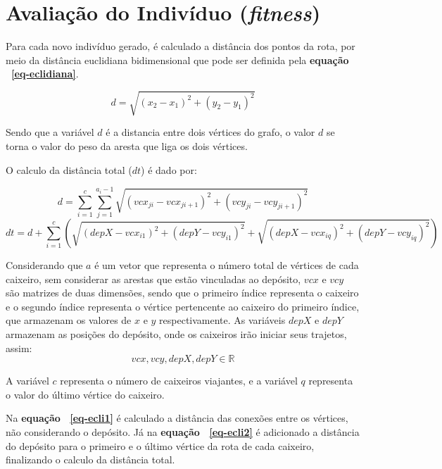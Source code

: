 \documentclass[12pt,openright,a4paper,twoside]{tcc}
\begin{document}
	   	
	   	\section{Avaliação do Indivíduo (\textit{fitness})}

		Para cada novo indivíduo gerado, é calculado a distância dos pontos da rota, por meio da distância euclidiana bidimensional que pode ser definida pela \textbf{equação ~\ref{eq-eclidiana}}.

		\begin{equation}
			d = \sqrt{(x_2-x_1)^2 + (y_2-y_1)^2}
			\label{eq-eclidiana}
		\end{equation}

		Sendo que a variável $d$ é a distancia entre dois vértices do grafo, o valor $d$ se torna o valor do peso da aresta que liga os dois vértices.

		O calculo da distância total ($dt$) é dado por:

		\begin{equation}
			d = \sum_{i=1}^{c} \sum_{j=1}^{a_i-1} \sqrt{(vcx_{ji}-vcx_{ji+1})^2 + (vcy_{ji}-vcy_{ji+1})^2}
			\label{eq-ecli1}
		\end{equation}
		\begin{equation}
			dt = d + \sum_{i=1}^{c} (\sqrt{(depX-vcx_{i1})^2 + (depY-vcy_{i1})^2} + \sqrt{(depX-vcx_{iq})^2 + (depY-vcy_{iq})^2})
			\label{eq-ecli2}
		\end{equation}

		Considerando que $a$ é um vetor que representa o número total de vértices de cada caixeiro, sem considerar as  arestas que estão vinculadas ao depósito, $vcx$ e $vcy$ são matrizes de duas dimensões, sendo que o primeiro índice representa o caixeiro e o segundo índice representa o vértice pertencente ao caixeiro do primeiro índice, que armazenam os valores de $x$ e $y$ respectivamente. As variáveis $depX$ e $depY$ armazenam as posições do depósito, onde os caixeiros irão iniciar seus trajetos, assim:
		\begin{equation}
			vcx, vcy, depX, depY \in \mathbb{R}   
			\label{eq-ecli4}
		\end{equation}

		A variável $c$ representa o número de caixeiros viajantes, e a variável $q$ representa o valor do último vértice do caixeiro.

		Na \textbf{equação ~\ref{eq-ecli1}} é calculado a distância das conexões entre os vértices, não considerando o depósito. Já na \textbf{equação ~\ref{eq-ecli2}} é adicionado a distância do depósito para o primeiro e o último vértice da rota de cada caixeiro, finalizando o calculo da distância total.
\end{document}
